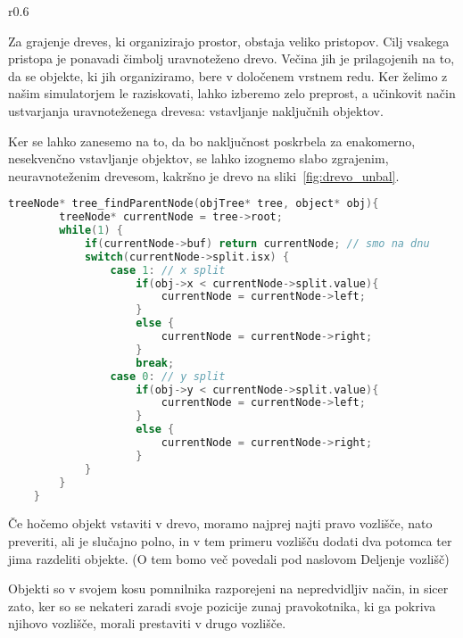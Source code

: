 \documentclass[a4paper,12pt]{article}
\begin{document}
\begin{wrapfigure}{r}{0.6\textwidth}
    \centering
    
    \caption{Neuravnoteženo drevo, če vstavljamo objekte, urejene po koordinatah}%
    \label{fig:drevo_unbal}
\end{wrapfigure}

Za grajenje dreves, ki organizirajo prostor, obstaja veliko pristopov. Cilj vsakega pristopa je ponavadi čimbolj
uravnoteženo drevo. Večina jih je prilagojenih na to, da se objekte, ki jih organiziramo, bere v določenem
vrstnem redu. Ker želimo z našim simulatorjem le raziskovati, lahko izberemo zelo 
preprost, a učinkovit način ustvarjanja uravnoteženega drevesa: vstavljanje naključnih objektov.

Ker se lahko zanesemo na to, da bo naključnost poskrbela za enakomerno, nesekvenčno vstavljanje objektov, se lahko
izognemo slabo zgrajenim, neuravnoteženim drevesom, kakršno je drevo na sliki~\ref{fig:drevo_unbal}.

\begin{lstlisting}[float, caption={Iskanje vozlišča, ki vsebuje objekt}, label=find_parent_node, language=C]
    treeNode* tree_findParentNode(objTree* tree, object* obj){
        treeNode* currentNode = tree->root;
        while(1) {
            if(currentNode->buf) return currentNode; // smo na dnu
            switch(currentNode->split.isx) {
                case 1: // x split
                    if(obj->x < currentNode->split.value){
                        currentNode = currentNode->left;
                    }
                    else {
                        currentNode = currentNode->right;
                    }
                    break;
                case 0: // y split
                    if(obj->y < currentNode->split.value){
                        currentNode = currentNode->left;
                    }
                    else {
                        currentNode = currentNode->right;
                    }
            }
        }
    }
\end{lstlisting}


Če hočemo objekt vstaviti v drevo, moramo najprej najti pravo vozlišče, nato preveriti,
ali je slučajno polno, in v tem primeru vozlišču dodati dva potomca ter jima razdeliti objekte.
(O tem bomo več povedali pod naslovom Deljenje vozlišč)

Objekti so v svojem kosu pomnilnika razporejeni na nepredvidljiv način, in sicer zato, ker so se nekateri
zaradi svoje pozicije zunaj pravokotnika, ki ga pokriva njihovo vozlišče, morali prestaviti v drugo vozlišče.
\end{document}
